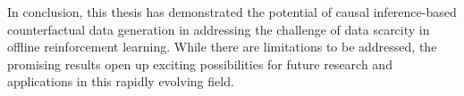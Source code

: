 In conclusion, this thesis has demonstrated the potential of causal
inference-based counterfactual data generation in addressing the challenge
of data scarcity in offline reinforcement learning.
While there are limitations to be addressed, the promising results
open up exciting possibilities for future research and applications in
this rapidly evolving field.